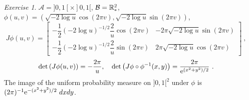 \documentclass[12pt,a4paper]{amsart}
\theoremstyle{plain}%
\theoremstyle{definition}
\theoremstyle{remark}
\newtheorem{exercise}{Exercise}
\begin{document}
\begin{exercise}
  $\mathcal A = ]0,1[\times ]0,1[$, $\mathcal B = \mathbb{R}^2_*$, $\phi(u,v)=(\sqrt{-2\log u}\cos(2\pi v),\sqrt{-2\log u}\sin(2\pi v))$,
\begin{equation*}
  J\phi(u,v) =
  \begin{bmatrix}
    - \dfrac12 (-2 \log u)^{-1/2} \dfrac {2}{u} \cos(2\pi v) & - 2\pi \sqrt{- 2\log u} \sin(2\pi v) \\ - \dfrac12 (-2 \log u)^{-1/2} \dfrac {2}{u} \sin(2\pi v) & 2\pi \sqrt{-2\log u} \cos(2\pi v)
  \end{bmatrix} \ ,
\end{equation*}
\begin{equation*}
  \detof{J\phi(u,v)} = - \frac {2\pi}{u}, \quad \detof{J\phi\circ\phi^{-1}(x,y)} = \frac{2\pi}{\euler^{(x^2+y^2)/2}} \ .
\end{equation*}
The image of the uniform probability measure on $]0,1[^2$ under $\phi$ is $(2\pi)^{-1} \euler^{-(x^2+y^2)/2} \ dxdy$.
\end{exercise}
\end{document}
